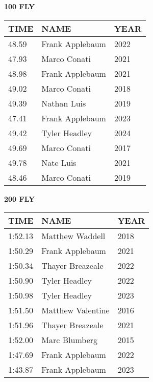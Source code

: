 \begin{table}[H]
\centering
\begin{minipage}[t]{0.48\textwidth}
\centering
\textbf{100 FLY}\\[0.1cm]
\begin{tabular}{@{}p{1.8cm}p{2.8cm}p{1.2cm}@{}}
\hline
    \textbf{TIME} & \textbf{NAME} & \textbf{YEAR} \\
\hline
    48.59 & Frank Applebaum & 2022 \\
    47.93 & Marco Conati & 2021 \\
    48.98 & Frank Applebaum & 2021 \\
    49.02 & Marco Conati & 2018 \\
    49.39 & Nathan Luis & 2019 \\
    47.41 & Frank Applebaum & 2023 \\
    49.42 & Tyler Headley & 2024 \\
    49.69 & Marco Conati & 2017 \\
    49.78 & Nate Luis & 2021 \\
    48.46 & Marco Conati & 2019 \\
\hline
\end{tabular}
\end{minipage}\hfill
\begin{minipage}[t]{0.48\textwidth}
\centering
\textbf{200 FLY}\\[0.1cm]
\begin{tabular}{@{}p{1.8cm}p{2.8cm}p{1.2cm}@{}}
\hline
    \textbf{TIME} & \textbf{NAME} & \textbf{YEAR} \\
\hline
    1:52.13 & Matthew Waddell & 2018 \\
    1:50.29 & Frank Applebaum & 2021 \\
    1:50.34 & Thayer Breazeale & 2022 \\
    1:50.90 & Tyler Headley & 2022 \\
    1:50.98 & Tyler Headley & 2023 \\
    1:51.50 & Matthew Valentine & 2016 \\
    1:51.96 & Thayer Breazeale & 2021 \\
    1:52.00 & Marc Blumberg & 2015 \\
    1:47.69 & Frank Applebaum & 2022 \\
    1:43.87 & Frank Applebaum & 2023 \\
\hline
\end{tabular}
\end{minipage}
\end{table}

